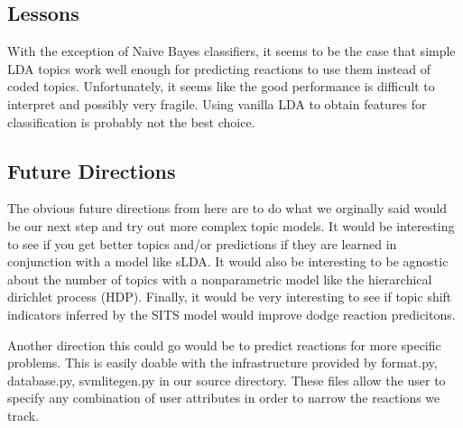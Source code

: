 
\subsection{Lessons}

With the exception of Naive Bayes classifiers, it seems to be the case that simple LDA topics work well enough for predicting reactions to use them instead of coded topics. 
Unfortunately, it seems like the good performance is difficult to interpret and possibly very fragile.
Using vanilla LDA to obtain features for classification is probably not the best choice.

\subsection{Future Directions}

The obvious future directions from here are to do what we orginally said would be our next step and try out more complex topic models.
It would be interesting to see if you get better topics and/or predictions if they are learned in conjunction with a model like sLDA.
It would also be interesting to be agnostic about the number of topics with a nonparametric model like the hierarchical dirichlet process (HDP).
Finally, it would be very interesting to see if topic shift indicators inferred by the SITS model would improve dodge reaction predicitons.

Another direction this could go would be to predict reactions for more specific problems.
This is easily doable with the infrastructure provided by format.py, database.py, svmlitegen.py in our source directory.
These files allow the user to specify any combination of user attributes in order to narrow the reactions we track.

